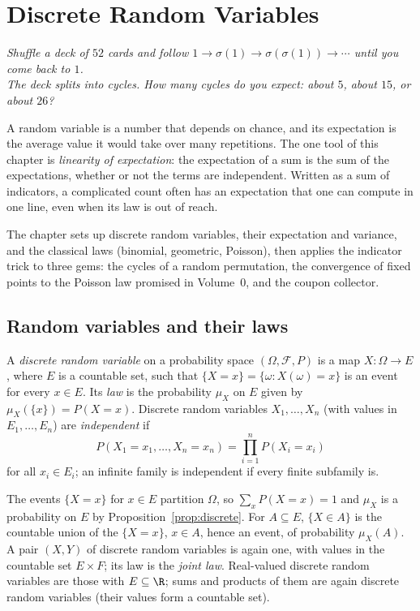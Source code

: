 \chapter{Discrete Random Variables}

\begin{center}\itshape
Shuffle a deck of $52$ cards and follow $1\to\sigma(1)\to\sigma(\sigma(1))\to\cdots$ until you come back to $1$.\\
The deck splits into cycles. How many cycles do you expect: about $5$, about $15$, or about $26$?
\end{center}

A random variable is a number that depends on chance, and its expectation is the average value it would take
over many repetitions. The one tool of this chapter is \emph{linearity of expectation}: the expectation of a sum is
the sum of the expectations, whether or not the terms are independent. Written as a sum of indicators, a
complicated count often has an expectation that one can compute in one line, even when its law is out of reach.

The chapter sets up discrete random variables, their expectation and variance, and the classical laws
(binomial, geometric, Poisson), then applies the indicator trick to three gems: the cycles of a random
permutation, the convergence of fixed points to the Poisson law promised in Volume~0, and the coupon collector.

\section{Random variables and their laws}

\begin{definition}
A \emph{discrete random variable} on a probability space $(\Omega,\mathcal F,P)$ is a map $X:\Omega\to E$, where
$E$ is a countable set, such that $\{X=x\}=\{\omega:X(\omega)=x\}$ is an event for every $x\in E$. Its \emph{law} is
the probability $\mu_X$ on $E$ given by $\mu_X(\{x\})=P(X=x)$. Discrete random variables $X_1,\dots,X_n$ (with values
in $E_1,\dots,E_n$) are \emph{independent} if
\[
P(X_1=x_1,\dots,X_n=x_n)=\prod_{i=1}^nP(X_i=x_i)
\]
for all $x_i\in E_i$; an infinite family is independent if every finite subfamily is.
\end{definition}

The events $\{X=x\}$ for $x\in E$ partition $\Omega$, so $\sum_xP(X=x)=1$ and $\mu_X$ is a probability on $E$ by
Proposition~\ref{prop:discrete}. For $A\subseteq E$, $\{X\in A\}$ is the countable union of the $\{X=x\}$, $x\in A$,
hence an event, of probability $\mu_X(A)$. A pair $(X,Y)$ of discrete random variables is again one, with values in
the countable set $E\times F$; its law is the \emph{joint law}. Real-valued discrete random variables are those with
$E\subseteq\R$; sums and products of them are again discrete random variables (their values form a countable set).

